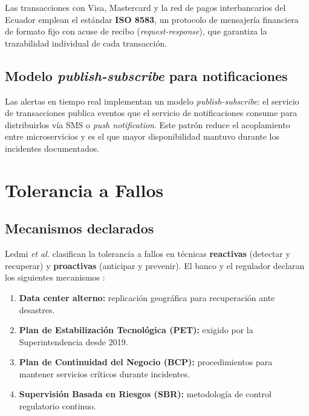 \documentclass[12pt,a4paper]{article}
\begin{document}
Las transacciones con Visa, Mastercard y la red de pagos interbancarios del Ecuador emplean el est\'andar \textbf{ISO 8583}, un protocolo de mensajer\'ia financiera de formato fijo con acuse de recibo (\textit{request-response}), que garantiza la trazabilidad individual de cada transacci\'on.

\subsection{Modelo \textit{publish-subscribe} para notificaciones}

Las alertas en tiempo real implementan un modelo \textit{publish-subscribe}: el servicio de transacciones publica eventos que el servicio de notificaciones consume para distribuirlos v\'ia SMS o \textit{push notification}. Este patr\'on reduce el acoplamiento entre microservicios \cite{DesignPatterns2024} y es el que mayor disponibilidad mantuvo durante los incidentes documentados.

\section{Tolerancia a Fallos}

\subsection{Mecanismos declarados}

Ledmi \textit{et al.} \cite{LedmiFaultTolerance2018} clasifican la tolerancia a fallos en t\'ecnicas \textbf{reactivas} (detectar y recuperar) y \textbf{proactivas} (anticipar y prevenir). El banco y el regulador declaran los siguientes mecanismos \cite{SuperbancosIncidente2021, SuperbancosSancion2025}:

\begin{enumerate}[leftmargin=1.5cm, itemsep=3pt]
  \item \textbf{Data center alterno:} replicaci\'on geogr\'afica para recuperaci\'on ante desastres.
  \item \textbf{Plan de Estabilizaci\'on Tecnol\'ogica (PET):} exigido por la Superintendencia desde 2019.
  \item \textbf{Plan de Continuidad del Negocio (BCP):} procedimientos para mantener servicios cr\'iticos durante incidentes.
  \item \textbf{Supervisi\'on Basada en Riesgos (SBR):} metodolog\'ia de control regulatorio continuo.
\end{enumerate}
\end{document}
